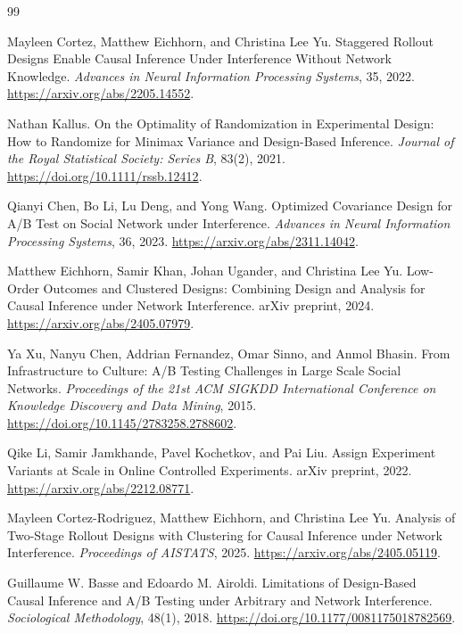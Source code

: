 \documentclass{article}
\begin{document}
\begin{thebibliography}{99}

   Mayleen Cortez, Matthew Eichhorn, and Christina Lee Yu. Staggered Rollout Designs Enable Causal Inference Under Interference Without Network Knowledge. \emph{Advances in Neural Information Processing Systems}, 35, 2022. \url{https://arxiv.org/abs/2205.14552}.

   Nathan Kallus. On the Optimality of Randomization in Experimental Design: How to Randomize for Minimax Variance and Design-Based Inference. \emph{Journal of the Royal Statistical Society: Series B}, 83(2), 2021. \url{https://doi.org/10.1111/rssb.12412}.

   Qianyi Chen, Bo Li, Lu Deng, and Yong Wang. Optimized Covariance Design for A/B Test on Social Network under Interference. \emph{Advances in Neural Information Processing Systems}, 36, 2023. \url{https://arxiv.org/abs/2311.14042}.

   Matthew Eichhorn, Samir Khan, Johan Ugander, and Christina Lee Yu. Low-Order Outcomes and Clustered Designs: Combining Design and Analysis for Causal Inference under Network Interference. arXiv preprint, 2024. \url{https://arxiv.org/abs/2405.07979}.

   Ya Xu, Nanyu Chen, Addrian Fernandez, Omar Sinno, and Anmol Bhasin. From Infrastructure to Culture: A/B Testing Challenges in Large Scale Social Networks. \emph{Proceedings of the 21st ACM SIGKDD International Conference on Knowledge Discovery and Data Mining}, 2015. \url{https://doi.org/10.1145/2783258.2788602}.

   Qike Li, Samir Jamkhande, Pavel Kochetkov, and Pai Liu. Assign Experiment Variants at Scale in Online Controlled Experiments. arXiv preprint, 2022. \url{https://arxiv.org/abs/2212.08771}.

   Mayleen Cortez-Rodriguez, Matthew Eichhorn, and Christina Lee Yu. Analysis of Two-Stage Rollout Designs with Clustering for Causal Inference under Network Interference. \emph{Proceedings of AISTATS}, 2025. \url{https://arxiv.org/abs/2405.05119}.

   Guillaume W. Basse and Edoardo M. Airoldi. Limitations of Design-Based Causal Inference and A/B Testing under Arbitrary and Network Interference. \emph{Sociological Methodology}, 48(1), 2018. \url{https://doi.org/10.1177/0081175018782569}.

\end{thebibliography}
\end{document}
